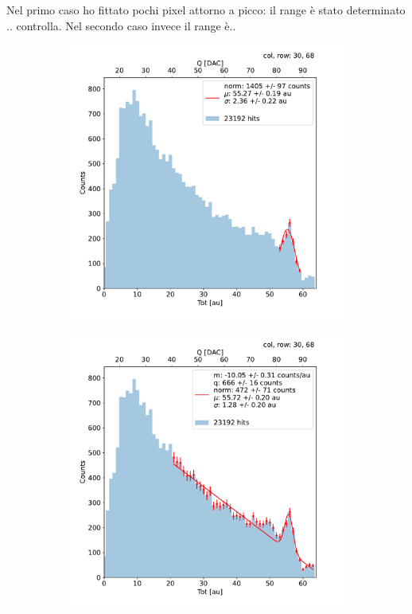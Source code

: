         Nel primo caso ho fittato pochi pixel attorno a picco: il range è stato determinato .. controlla. 
        Nel secondo caso invece il range è..
        
        \begin{figure}[h!]
            \begin{subfigure}{.5\textwidth}
            \centering
            \includegraphics[width=.99\linewidth]{figures/charaterization/fit_gauss_r69.pdf}
            \label{fig:}
            \end{subfigure}
            \begin{subfigure}{.5\textwidth}
            \centering
            \includegraphics[width=.99\linewidth]{figures/charaterization/fit_line_gauss_r69.pdf}

\end{subfigure}
\end{figure}
